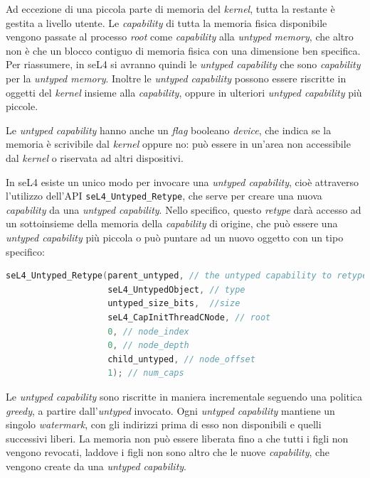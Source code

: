 Ad eccezione di una piccola parte di memoria del \textit{kernel}, tutta la restante è gestita a livello utente. Le \textit{capability} di tutta la memoria fisica disponibile vengono passate al processo \textit{root} come \textit{capability} alla \textit{untyped memory}, che altro non è che un blocco contiguo di memoria fisica con una dimensione ben specifica. Per riassumere, in seL4 si avranno quindi le \textit{untyped capability} che sono \textit{capability} per la \textit{untyped memory}. Inoltre le \textit{untyped capability} possono essere riscritte in oggetti del \textit{kernel} insieme alla \textit{capability}, oppure in ulteriori \textit{untyped capability} più piccole.

Le \textit{untyped capability} hanno anche un \textit{flag} booleano \textit{device}, che indica se la memoria è scrivibile dal \textit{kernel} oppure no: può essere in un'area non accessibile dal \textit{kernel} o riservata ad altri dispositivi.

In seL4 esiste un unico modo per invocare una \textit{untyped capability}, cioè attraverso l'utilizzo dell'API \texttt{seL4\_Untyped\_Retype}, che serve per creare una nuova \textit{capability} da una \textit{untyped capability}. Nello specifico, questo \textit{retype} darà accesso ad un sottoinsieme della memoria della \textit{capability} di origine, che può essere una \textit{untyped capability} più piccola o può puntare ad un nuovo oggetto con un tipo specifico:
\begin{lstlisting}[language=C++]
seL4_Untyped_Retype(parent_untyped, // the untyped capability to retype
                    seL4_UntypedObject, // type
                    untyped_size_bits,  //size
                    seL4_CapInitThreadCNode, // root
                    0, // node_index
                    0, // node_depth
                    child_untyped, // node_offset
                    1); // num_caps
\end{lstlisting}

Le \textit{untyped capability} sono riscritte in maniera incrementale seguendo una politica \textit{greedy}, a partire dall'\textit{untyped} invocato. Ogni \textit{untyped capability} mantiene un singolo \textit{watermark}, con gli indirizzi prima di esso non disponibili e quelli successivi liberi. La memoria non può essere liberata fino a che tutti i figli non vengono revocati, laddove i figli non sono altro che le nuove \textit{capability}, che vengono create da una \textit{untyped capability}.

